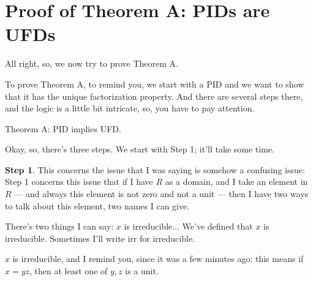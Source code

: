 \begin{hidden}
\end{hidden}

\section{Proof of Theorem A: PIDs are UFDs}

\begin{speech}[00:28:25 - 00:30:11]
All right, so, we now try to prove Theorem A. 

To prove Theorem A, to remind you, we start with a PID and we want to show that it has the unique factorization property. And there are several steps there, and the logic is a little bit intricate, so, you have to pay attention. 

Theorem A:  PID  implies  UFD. 

Okay, so, there's three steps. We start with Step 1; it'll take some time.

\textbf{Step 1}.  This concerns the issue that I was saying is somehow a confusing issue: Step 1 concerns this issue that if I have $R$ as a domain,  and I take an element in $R$ --- and always this element is not zero and not a unit ---  then I have two ways to talk about this element, two names I can give.

There's two things I can say: $x$ is irreducible...  We've defined that $x$ is irreducible. Sometimes I'll write $\text{irr}$ for irreducible.

$x$ is irreducible, and I remind you, since it was a few minutes ago: this means if $x = y z$,  then at least one  of $y, z$ is a unit.
\end{speech}


